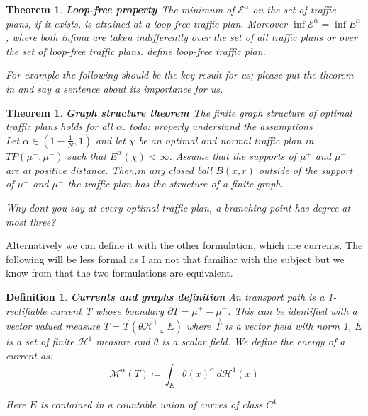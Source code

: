\documentclass[11pt,reqno,a4paper]{amsart}
\numberwithin{equation}{section}
\theoremstyle{mytheorem}
\newtheorem{theorem}[subsection]{Theorem}
\newtheorem{definition}[subsubsection]{Definition}
\theoremstyle{myremark}
\theoremstyle{myparagraph}
\begin{document}
    \begin{theorem}
        \textbf{Loop-free property \cite[Proposition 4.9]{Bernot}}
        \label{lemma:loop_free}
        The minimum of $\mathcal{E}^{\alpha}$ on the set of traffic plans, if it exists, is attained
        at a loop-free traffic plan. Moreover $\inf\mathcal{E}^{\alpha} =\inf E^\alpha$, where both
        infima are taken indifferently over the set of all traffic plans or over the set of loop-free traffic
        plans. {\color{red} define loop-free traffic plan.}

            {\color{red} For example the following should be the key result for us; please put the theorem in and say a sentence about its importance for us.}
    \end{theorem}

    \begin{theorem}
        \textbf{Graph structure theorem \cite[Lemma 8.14]{Bernot}}
        \cite[Theorem ?]{well_posedness}
        The finite graph structure of optimal traffic plans holds for all $\alpha$.
        todo: properly understand the assumptions
        \\

        Let $\alpha \in \left( 1-\frac{1}{N}, 1 \right)$ and let $\chi$ be an optimal and normal traffic
        plan in $TP(\mu^+, \mu^-)$ such that $E^\alpha(\chi) < \infty$. Assume that the supports
        of $\mu^+$ and $\mu^-$ are at positive distance. Then,in any closed ball $B(x, r)$ outside
        of the support of $\mu^+$ and $\mu^-$ the traffic plan has the structure of a finite graph.

            {\color{red} Why dont you say at every optimal traffic plan, a branching point has degree at most three?}

    \end{theorem}

    {\color{teal} Alternatively we can define it with the other formulation, which are currents. The following will be less formal
    as I am not that familiar with the subject but we know from \cite{Bernot} that the two formulations are equivalent.}

    \begin{definition}
        \textbf{Currents and graphs definition}
        An transport path is a 1-rectifiable current T whose boundary $\partial T = \mu^+ - \mu^-$. This can be identified with a vector valued
        measure $T = \vec{T}(\theta \mathcal{H}^1 \llcorner E)$ where $\vec{T}$ is a vector field with norm 1, $E$ is a set of finite $\mathcal{H}^1$ measure and
        $\theta$ is a scalar field.
        We define the energy of a current as:
        \begin{equation}
            \mathcal{M}^{\alpha}(T) \coloneqq \int_{E} \theta(x)^\alpha \, d\mathcal{H}^1(x)
        \end{equation}

        Here $E$ is contained in a countable union of curves of class $C^1$.
    \end{definition}
\end{document}
